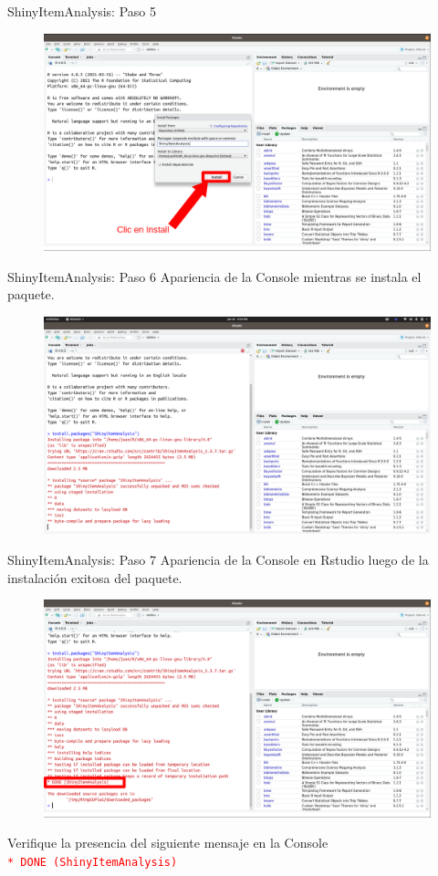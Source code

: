 \documentclass{beamer}
\begin{document}
\begin{frame}{ShinyItemAnalysis: Paso 5}
\begin{figure}
\centering
\includegraphics[width=.92\textwidth]{Paso4.png}
\end{figure}  
\end{frame}

\begin{frame}{ShinyItemAnalysis: Paso 6}
Apariencia de la Console mientras se instala el paquete.
\begin{figure}
\centering
\includegraphics[width=.85\textwidth]{Paso5.png}
\end{figure}  
\end{frame}

\begin{frame}{ShinyItemAnalysis: Paso 7}
Apariencia de la Console en Rstudio luego de la instalación exitosa del paquete.
\begin{figure}
\centering
\includegraphics[width=.85\textwidth]{Paso6.png}
\end{figure}  
Verifique la presencia del siguiente mensaje en la Console\\
\textcolor{red}{\texttt{* DONE (ShinyItemAnalysis)}}
\end{frame}
\end{document}
